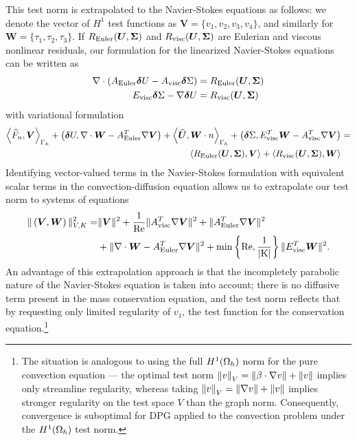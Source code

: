 This test norm is extrapolated to the Navier-Stokes equations as follows: we denote the vector of $H^1$ test functions as $\boldsymbol V=\{v_1,v_2,v_3,v_4\}$, and similarly for $\boldsymbol W = \{\tau_1,\tau_2,\tau_3\}$. If $R_{\rm Euler}(\boldsymbol U,\boldsymbol \Sigma)$ and $R_{\rm visc}(\boldsymbol U,\boldsymbol \Sigma)$ are Eulerian and viscous nonlinear residuals, our formulation for the linearized Navier-Stokes equations can be written as
\begin{align*}
\div \left(A_{\rm Euler}\boldsymbol \delta U - A_{\rm visc}\boldsymbol \delta \Sigma\right) &= R_{\rm Euler}(\boldsymbol U,\boldsymbol \Sigma)\\
E_{\rm visc}\boldsymbol  \delta \Sigma - \grad \boldsymbol \delta U &= R_{\rm visc}(\boldsymbol U,\boldsymbol \Sigma)
\end{align*}
with variational formulation
\begin{align*}
\LRa{\widehat{F}_n,\boldsymbol V}_{\Gh} + \left(\boldsymbol \delta U,\div \boldsymbol W - A_{\rm Euler}^T\grad \boldsymbol  V\right) + \LRa{\widehat{\boldsymbol U},\boldsymbol W\cdot n}_{\Gh} + \left(\boldsymbol \delta \Sigma,E_{\rm visc}^T\boldsymbol W - A_{\rm visc}^T\grad \boldsymbol  V\right) &= 
\\ \LRa{R_{\rm Euler}(\boldsymbol U,\boldsymbol \Sigma),\boldsymbol V} + \LRa{R_{\rm visc}(\boldsymbol U,\boldsymbol \Sigma),\boldsymbol W}
\end{align*}
Identifying vector-valued terms in the Navier-Stokes formulation with equivalent scalar terms in the convection-diffusion equation allows us to extrapolate our test norm to systems of equations
\begin{align*}
\|\left(\boldsymbol V,\boldsymbol W\right)\|_{V, K}^2 =& \|\boldsymbol V\|^2 + \frac{1}{\Reyn} \|A_{\rm visc}^T\grad \boldsymbol V\|^2 + \|A_{\rm Euler}^T \grad \boldsymbol V\|^2 \\
& + \| \div \boldsymbol W - A_{\rm Euler}^T \grad \boldsymbol V\|^2 + \min\left\{\Reyn,\frac{1}{|K|}\right\}\|E_{\rm visc}^T\boldsymbol W\|^2.
\end{align*}
An advantage of this extrapolation approach is that the incompletely parabolic nature of the Navier-Stokes equation is taken into account; there is no diffusive term present in the mass conservation equation, and the test norm reflects that by requesting only limited regularity of $v_1$, the test function for the conservation equation.\footnote{The situation is analogous to using the full $H^1(\Oh)$ norm for the pure convection equation --- the optimal test norm $\nor{v}_V = \nor{\beta\cdot \grad v} + \nor{v}$ implies only streamline regularity, whereas taking $\nor{v}_V = \nor{\grad v} + \nor{v}$ implies stronger regularity on the test space $V$ than the graph norm. Consequently, convergence is suboptimal for DPG applied to the convection problem under the $H^1(\Oh)$ test norm.}

